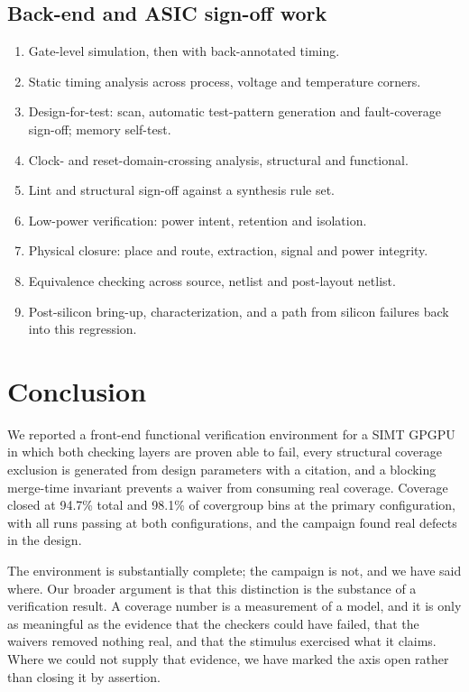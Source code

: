 \documentclass[conference]{IEEEtran}
\begin{document}
\subsection{Back-end and ASIC sign-off work}
\begin{enumerate}
\item Gate-level simulation, then with back-annotated timing.
\item Static timing analysis across process, voltage and temperature
corners.
\item Design-for-test: scan, automatic test-pattern generation and
fault-coverage sign-off; memory self-test.
\item Clock- and reset-domain-crossing analysis, structural and
functional.
\item Lint and structural sign-off against a synthesis rule set.
\item Low-power verification: power intent, retention and isolation.
\item Physical closure: place and route, extraction, signal and power
integrity.
\item Equivalence checking across source, netlist and post-layout netlist.
\item Post-silicon bring-up, characterization, and a path from silicon
failures back into this regression.
\end{enumerate}

\section{Conclusion}

We reported a front-end functional verification environment for a SIMT
GPGPU in which both checking layers are proven able to fail, every
structural coverage exclusion is generated from design parameters with a
citation, and a blocking merge-time invariant prevents a waiver from
consuming real coverage. Coverage closed at 94.7\% total and 98.1\% of
covergroup bins at the primary configuration, with all runs passing at
both configurations, and the campaign found real defects in the design.

The environment is substantially complete; the campaign is not, and we
have said where. Our broader argument is that this distinction is the
substance of a verification result. A coverage number is a measurement of
a model, and it is only as meaningful as the evidence that the checkers
could have failed, that the waivers removed nothing real, and that the
stimulus exercised what it claims. Where we could not supply that
evidence, we have marked the axis open rather than closing it by
assertion.

\balance
\end{document}
